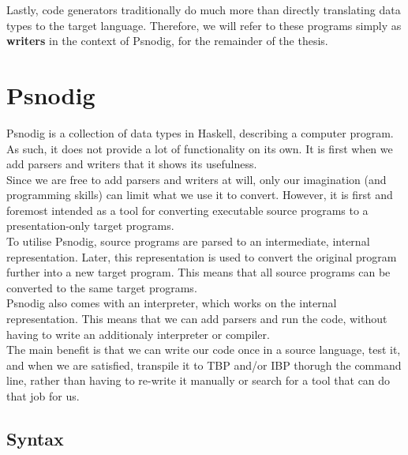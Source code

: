 Lastly, code generators traditionally do much more than directly translating data types to the target language. Therefore, we will refer to these programs simply as \textbf{writers} in the context of Psnodig, for the remainder of the thesis. \hfill \\


\section{Psnodig}

Psnodig is a collection of data types in Haskell, describing a computer program. As such, it does not provide a lot of functionality on its own. It is first when we add parsers and writers that it shows its usefulness. \hfill \\

Since we are free to add parsers and writers at will, only our imagination (and programming skills) can limit what we use it to convert. However, it is first and foremost intended as a tool for converting executable source programs to a presentation-only target programs. \hfill \\

To utilise Psnodig, source programs are parsed to an intermediate, internal representation. Later, this representation is used to convert the original program further into a new target program. This means that all source programs can be converted to the same target programs. \hfill \\

Psnodig also comes with an interpreter, which works on the internal representation. This means that we can add parsers and run the code, without having to write an additionaly interpreter or compiler. \hfill \\

The main benefit is that we can write our code once in a source language, test it, and when we are satisfied, transpile it to TBP and/or IBP thorugh the command line, rather than having to re-write it manually or search for a tool that can do that job for us. \hfill \\

\subsection{Syntax}

